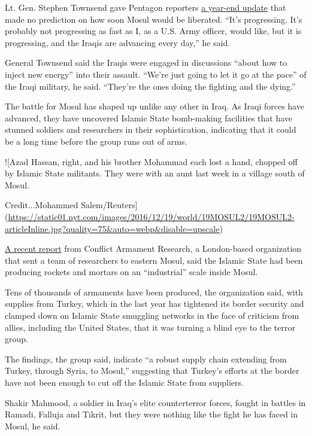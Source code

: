 Lt. Gen. Stephen Townsend gave Pentagon reporters
\href{https://news.pub.mediadc.com/wta/link.php?AGENCY=AB\&M=40612166\&N=64093\&L=35124\&F=H}{a
year-end update} that made no prediction on how soon Mosul would be
liberated. ``It's progressing. It's probably not progressing as fast as
I, as a U.S. Army officer, would like, but it is progressing, and the
Iraqis are advancing every day,'' he said.

General Townsend said the Iraqis were engaged in discussions ``about how
to inject new energy'' into their assault. ``We're just going to let it
go at the pace'' of the Iraqi military, he said. ``They're the ones
doing the fighting and the dying.''

The battle for Mosul has shaped up unlike any other in Iraq. As Iraqi
forces have advanced, they have uncovered Islamic State bomb-making
facilities that have stunned soldiers and researchers in their
sophistication, indicating that it could be a long time before the group
runs out of arms.

!{[}Azad Hassan, right, and his brother Mohammad each lost a hand,
chopped off by Islamic State militants. They were with an aunt last week
in a village south of Mosul.

Credit...Mohammed
Salem/Reuters{]}(\url{https://static01.nyt.com/images/2016/12/19/world/19MOSUL2/19MOSUL2-articleInline.jpg?quality=75\&auto=webp\&disable=upscale})

\href{http://www.conflictarm.com/publications/}{A recent report} from
Conflict Armament Research, a London-based organization that sent a team
of researchers to eastern Mosul, said the Islamic State had been
producing rockets and mortars on an ``industrial'' scale inside Mosul.

Tens of thousands of armaments have been produced, the organization
said, with supplies from Turkey, which in the last year has tightened
its border security and clamped down on Islamic State smuggling networks
in the face of criticism from allies, including the United States, that
it was turning a blind eye to the terror group.

The findings, the group said, indicate ``a robust supply chain extending
from Turkey, through Syria, to Mosul,'' suggesting that Turkey's efforts
at the border have not been enough to cut off the Islamic State from
suppliers.

Shakir Mahmood, a soldier in Iraq's elite counterterror forces, fought
in battles in Ramadi, Falluja and Tikrit, but they were nothing like the
fight he has faced in Mosul, he said.

